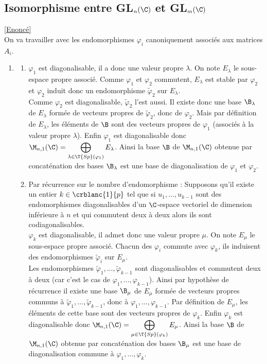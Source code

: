 \documentclass[8pt]{book}
\begin{document}
	\subsection{Isomorphisme entre GL$_n(\C)$ et GL$_m(\C)$}
	\label{Isomorphisme entre GLn(C) et GLm(C) corrigé}
	\textcolor{blue}{\hyperref[Isomorphisme entre GLn(C) et GLm(C)]{[Enoncé]}}\\
	 On va travailler avec les endomorphismes $\varphi_i$ canoniquement associés aux matrices $A_i$.
	 \begin{enumerate}[leftmargin=*]
	 \item	\begin{enumerate}[label=\alph*.]
		\item $\varphi_1$ est diagonalisable, il a donc une valeur propre $\lambda$. On note $E_\lambda$ le sous-espace propre associé. Comme $\varphi_1$ et $\varphi_2$ commutent, $E_\lambda$ est stable par $\varphi_2$ et $\varphi_2$ induit donc un endomorphisme $\tilde \varphi_2$ sur $E_\lambda$.\\
		Comme $\varphi_2$ est diagonalisable, $\tilde \varphi_2$ l'est aussi. Il existe donc une base $\B_\lambda$ de $E_\lambda$ formée de vecteurs propres de $\tilde\varphi_2$, donc de $\varphi_2$. Mais par définition de $E_\lambda$, les éléments de $\B$ sont des vecteurs propres de $\varphi_1$ (associés à la valeur propre $\lambda$). Enfin $\varphi_1$ est diagonalisable donc $\M_{n,1}(\C)=\displaystyle\bigoplus_{\lambda\in\T{Sp}(\varphi_1)}E_\lambda$. Ainsi la base $\B$ de $\M_{n,1}(\C)$ obtenue par concaténation des bases $\B_\lambda$ est une base de diagonalisation de $\varphi_1$ et $\varphi_2$.
		\item Par récurrence sur le nombre d'endomorphisme : Supposons qu'il existe un entier $k\in \crblanc{1}{p}$ tel que si $u_1,\dots,u_{k-1}$ sont des endomorphismes diagonalisables d'un $\C$-espace vectoriel de dimension inférieure à $n$ et qui commutent deux à deux alors ils sont codiagonalisables.\\
		$\varphi_k$ est diagonalisable, il admet donc une valeur propre $\mu$. On note $E_\mu$ le sous-espace propre associé. Chacun des $\varphi_i$ commute avec $\varphi_k$, ils induisent des endomorphismes $\tilde \varphi_i$ sur $E_\mu$.\\
		Les endomorphismes $\tilde \varphi_1,\dots,\tilde \varphi_{k-1}$ sont diagonalisables et commutent deux à deux (car c'est le cas de $\varphi_1,\dots,\varphi_{k-1}$). Ainsi par hypothèse de récurrence il existe une base $\B_\mu$ de $E_\mu$ formée de vecteurs propres communs à $\tilde\varphi_1,\dots,\tilde\varphi_{k-1}$, donc à $\varphi_1,\dots,\varphi_{k-1}$. Par définition de $E_\mu$, les éléments de cette base sont des vecteurs propres de $\varphi_k$. Enfin $\varphi_k$ est diagonalisable donc $\M_{n,1}(\C)=\displaystyle\bigoplus_{\mu\in\T{Sp}(\varphi_k)}E_\mu$. Ainsi la base $\B$ de $\M_{n,1}(\C)$ obtenue par concaténation des bases $\B_\mu$ est une base de diagonalisation commune à $\varphi_1,\dots,\varphi_k$.

\end{enumerate}
\end{enumerate}
\end{document}
